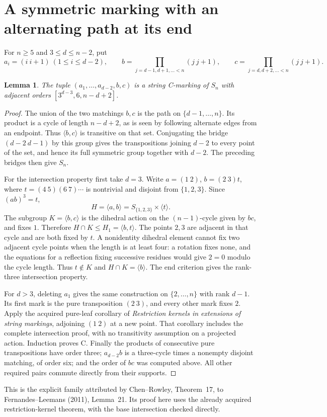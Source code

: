 \documentclass[11pt,a4paper]{article}
\newtheorem{lemma}{Lemma}
\newcommand{\gen}[1]{\langle#1\rangle}
\begin{document}
\section{A symmetric marking with an alternating path at its end}
For $n\ge5$ and $3\le d\le n-2$, put
\[
 a_i=(i\ i+1)\ (1\le i\le d-2),\qquad
 b=\prod_{j=d-1,d+1,\ldots<n}(j\ j+1),\qquad
 c=\prod_{j=d,d+2,\ldots<n}(j\ j+1).
\]
\begin{lemma}\label{symmetric}
The tuple $(a_1,\ldots,a_{d-2},b,c)$ is a string C-marking of $S_n$
with adjacent orders $[3^{d-3},6,n-d+2]$.
\end{lemma}
\begin{proof}
The union of the two matchings $b,c$ is the path on
$\{d-1,\ldots,n\}$. Its product is a cycle of length $n-d+2$,
as is seen by following alternate edges from an endpoint.
Thus $\gen{b,c}$ is transitive on that set. Conjugating the bridge
$(d-2\ d-1)$ by this group gives the transpositions joining $d-2$
to every point of the set, and hence its full symmetric group together
with $d-2$. The preceding bridges then give $S_n$.

For the intersection property first take $d=3$. Write $a=(1\ 2)$,
$b=(2\ 3)t$, where $t=(4\ 5)(6\ 7)\cdots$ is nontrivial and
disjoint from $\{1,2,3\}$. Since $(ab)^3=t$,
\[
 H=\gen{a,b}=S_{\{1,2,3\}}\times\gen t.
\]
The subgroup $K=\gen{b,c}$ is the dihedral action on the
$(n-1)$-cycle given by $bc$, and fixes $1$. Therefore
$H\cap K\le H_1=\gen{b,t}$. The points $2,3$ are adjacent in
that cycle and are both fixed by $t$. A nonidentity dihedral element
cannot fix two adjacent cycle points when the length is at least four:
a rotation fixes none, and the equations for a reflection fixing
successive residues would give $2=0$ modulo the cycle length.
Thus $t\notin K$ and $H\cap K=\gen b$. The end criterion gives
the rank-three intersection property.

For $d>3$, deleting $a_1$ gives the same construction on
$\{2,\ldots,n\}$ with rank $d-1$. Its first mark is the pure
transposition $(2\ 3)$, and every other mark fixes $2$.
Apply the acquired pure-leaf corollary of \emph{Restriction kernels
in extensions of string markings}, adjoining $(1\ 2)$ at a new point.
That corollary includes the complete intersection proof, with no
transitivity assumption on a projected action. Induction proves C.
Finally the products of consecutive pure transpositions have order
three; $a_{d-2}b$ is a three-cycle times a nonempty disjoint matching,
of order six; and the order of $bc$ was computed above. All other
required pairs commute directly from their supports.
\end{proof}
This is the explicit family attributed by Chen--Rowley, Theorem~17,
to Fernandes--Leemans (2011), Lemma~21. Its proof here uses the
already acquired restriction-kernel theorem, with the base intersection
checked directly.
\end{document}
